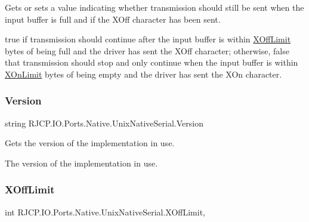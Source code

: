 Gets or sets a value indicating whether transmission should still be sent when the input buffer is full and if the X\+Off character has been sent. 

{\ttfamily true} if transmission should continue after the input buffer is within \mbox{\hyperlink{class_r_j_c_p_1_1_i_o_1_1_ports_1_1_native_1_1_unix_native_serial_ae80e0cf0e9e2af4b95dead5e4768d55d}{X\+Off\+Limit}} bytes of being full and the driver has sent the X\+Off character; otherwise, {\ttfamily false} that transmission should stop and only continue when the input buffer is within \mbox{\hyperlink{class_r_j_c_p_1_1_i_o_1_1_ports_1_1_native_1_1_unix_native_serial_ae9ce2190791a37c339f63b397d0301ef}{X\+On\+Limit}} bytes of being empty and the driver has sent the X\+On character. \mbox{\label{class_r_j_c_p_1_1_i_o_1_1_ports_1_1_native_1_1_unix_native_serial_af6d578936bff117d91b43d8d3129ad2d}} 
\subsubsection{\texorpdfstring{Version}{Version}}
{\footnotesize\ttfamily string R\+J\+C\+P.\+I\+O.\+Ports.\+Native.\+Unix\+Native\+Serial.\+Version\hspace{0.3cm}{\ttfamily [get]}}



Gets the version of the implementation in use. 

The version of the implementation in use. \mbox{\label{class_r_j_c_p_1_1_i_o_1_1_ports_1_1_native_1_1_unix_native_serial_ae80e0cf0e9e2af4b95dead5e4768d55d}} 
\subsubsection{\texorpdfstring{XOffLimit}{XOffLimit}}
{\footnotesize\ttfamily int R\+J\+C\+P.\+I\+O.\+Ports.\+Native.\+Unix\+Native\+Serial.\+X\+Off\+Limit\hspace{0.3cm}{\ttfamily [get]}, {\ttfamily [set]}}



